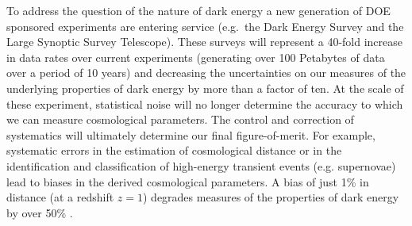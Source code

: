 \documentclass[prd,nofootbib,floatfix,11pt,tightenlines,nofootinbib]{revtex4}
\begin{document}
To address the question of the nature of dark energy a new generation
of DOE sponsored experiments are entering service (e.g.\ the Dark
Energy Survey and the
Large Synoptic Survey Telescope).  These
surveys will represent a 40-fold increase in data rates over current
experiments (generating over 100 Petabytes of data over a period of 10
years) and decreasing the uncertainties on our measures of the
underlying properties of dark energy by more than a factor of ten.
At the scale of these experiment, statistical noise will no longer
determine the accuracy
 to which we can measure cosmological
parameters. The control and
 correction of systematics will
ultimately determine our final
 figure-of-merit. For example,
systematic errors in the estimation of cosmological distance or in the
identification and classification of high-energy transient events
(e.g. supernovae) lead to biases in the derived cosmological
parameters. A bias of just 1\% in distance (at a redshift $z=1$) degrades
measures of the properties of dark energy by over 50\%
\cite{kitching,huterer2006,nakajima2011}.
\end{document}
